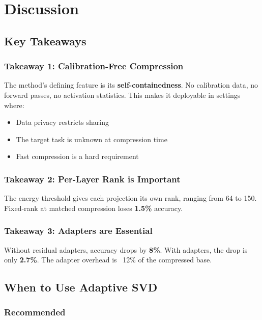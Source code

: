 
\section{Discussion}

\subsection{Key Takeaways}

\subsubsection{Takeaway 1: Calibration-Free Compression}

The method's defining feature is its \textbf{self-containedness}. No calibration 
data, no forward passes, no activation statistics. This makes it deployable 
in settings where:
\begin{itemize}
\item Data privacy restricts sharing
\item The target task is unknown at compression time
\item Fast compression is a hard requirement

\end{itemize}
\subsubsection{Takeaway 2: Per-Layer Rank is Important}

The energy threshold gives each projection its own rank, ranging from 
64 to 150. Fixed-rank at matched compression loses 
\textbf{1.5\%} accuracy.

\subsubsection{Takeaway 3: Adapters are Essential}

Without residual adapters, accuracy drops by \textbf{8\%}. With 
adapters, the drop is only \textbf{2.7\%}. The adapter overhead is 
~12\% of the compressed base.

\subsection{When to Use Adaptive SVD}

\subsubsection{Recommended}

